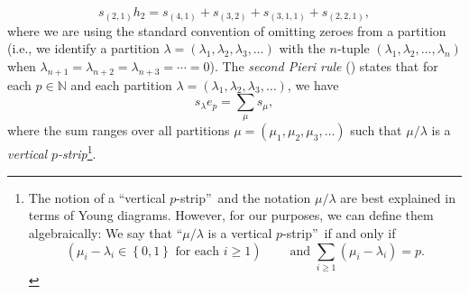 \documentclass[numbers=enddot,12pt,final,onecolumn,notitlepage,english]{scrartcl}%
\theoremstyle{definition}
\let\sumnonlimits\sum
\renewcommand{\sum}{\sumnonlimits\limits}
\begin{document}
\[
s_{\left(  2,1\right)  }h_{2}=s_{\left(  4,1\right)  }+s_{\left(  3,2\right)
}+s_{\left(  3,1,1\right)  }+s_{\left(  2,2,1\right)  },
\]
where we are using the standard convention of omitting zeroes from a partition
(i.e., we identify a partition $\lambda=\left(  \lambda_{1},\lambda
_{2},\lambda_{3},\ldots\right)  $ with the $n$-tuple $\left(  \lambda
_{1},\lambda_{2},\ldots,\lambda_{n}\right)  $ when $\lambda_{n+1}%
=\lambda_{n+2}=\lambda_{n+3}=\cdots=0$). The \emph{second Pieri rule}
(\cite[Chapter I, (5.17)]{Macdon95}) states that for each $p\in\mathbb{N}$ and
each partition $\lambda=\left(  \lambda_{1},\lambda_{2},\lambda_{3}%
,\ldots\right)  $, we have%
\begin{equation}
s_{\lambda}e_{p}=\sum_{\mu}s_{\mu}, \label{eq.intro.pieri2}%
\end{equation}
where the sum ranges over all partitions $\mu=\left(  \mu_{1},\mu_{2},\mu
_{3},\ldots\right)  $ such that $\mu/\lambda$ is a \emph{vertical }%
$p$\emph{-strip}\footnote{The notion of a \textquotedblleft vertical
$p$-strip\textquotedblright\ and the notation $\mu/\lambda$ are best explained
in terms of Young diagrams. However, for our purposes, we can define them
algebraically: We say that \textquotedblleft$\mu/\lambda$ is a vertical
$p$-strip\textquotedblright\ if and only if
\[
\left(  \mu_{i}-\lambda_{i}\in\left\{  0,1\right\}  \text{ for each }%
i\geq1\right)  \ \ \ \ \ \ \ \ \ \ \text{and }\sum_{i\geq1}\left(  \mu
_{i}-\lambda_{i}\right)  =p.
\]
}.
\end{document}
